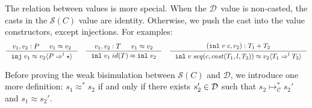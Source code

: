 \documentclass[acmsmall,review,anonymous]{acmart}\settopmatter{printfolios=true,printccs=false,printacmref=false}
\newcommand{\plus}[0]{+}
\newcommand{\TOOdyn}[0]{\star}
\newcommand{\POOfun}[2]{#1 \shortrightarrow #2}
\newcommand{\POOsum}[2]{#1 \plus #2}
\newcommand{\cOOcast}[3]{#1 \Rightarrow^{#2} #3}
\newcommand{\vOOcast}[2]{#1\langle#2\rangle}
\newcommand{\vOOfun}[3]{\mathtt{fun} \; #1 \; #2 \; #3}
\newcommand{\vOOinl}[1]{\mathtt{inl}\;#1}
\newcommand{\hcvOOinj}[2]{\mathtt{inj} \; #2}
\newcommand{\hcvOOfun}[5]{\mathtt{fun} \; #1 \; #2 \; #3 \; #4 \; #5}
\newcommand{\hcvOOcons}[4]{\mathtt{cons}\;#1\;#2\;#3\;#4}
\newcommand{\hcvOOinl}[2]{\mathtt{inl}\;#1\;#2}
\newcommand{\judgeCreduceTrans}[2]{#1 \longmapsto_{\mathcal{C}}^{*} #2}
\newcommand{\ineffCEKD}{$ \mathcal{D} $}
\newcommand{\effCEK}[1]{$ \mathcal{S}(#1) $}
\begin{document}
The relation between values is more special. When the \ineffCEKD\ value is 
non-casted, the casts in the \effCEK{C} value are identity. Otherwise, we push 
the cast into the value constructors, except injections. For examples: 
\begin{gather*}
\inference{
	v_1, v_2 : P &
	v_1 \approx v_2
}{
	\hcvOOinj{P_1}{v_1} \approx \vOOcast{v_2}{\cOOcast{P}{l}{\TOOdyn}}
}
\quad
\inference{
	v_1, v_2 : T &
	v_1 \approx v_2
}{
	\hcvOOinl{v_1}{id(T)} \approx \vOOinl{v_2}
}
\quad
\inference{
	(\hcvOOinl{v}{c}, v_2) : \POOsum{T_1}{T_2}
}{
	\hcvOOinl{v}{seq(c,cast(T_1,l,T_3))} \approx 
	\vOOcast{v_2}{\cOOcast{T_1}{l}{T_3}}
}
\end{gather*}

Before proving the weak bisimulation between \effCEK{C} and \ineffCEKD, we 
introduce one more definition: $ s_1 \approx^{*} s_2 $ if and only if there 
exists $ s_2' \in \text{\ineffCEKD} $ 
such that $ \judgeCreduceTrans{s_2}{s_2'}$ and $ s_1 \approx s_2' $.
\end{document}
